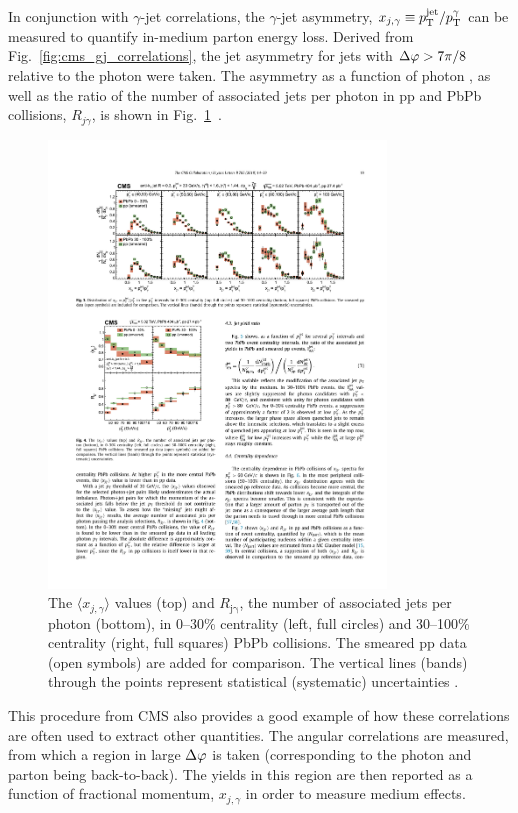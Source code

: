 In conjunction with $\gamma$-jet correlations, the $\gamma$-jet asymmetry, $x_{j,\gamma}\equiv p_{\mathrm{T}}^\mathrm{jet}/p_{\mathrm{T}}^\gamma$ can be measured to quantify in-medium parton energy loss. Derived from Fig.~\ref{fig:cms_gj_correlations}, the jet asymmetry for jets with $\Delta\varphi > 7\pi/8$ relative to the photon were taken. The asymmetry as a function of photon \pt, as well as the ratio of the number of associated jets per photon in pp and PbPb collisions, $R_{j\gamma}$, is shown in Fig.~\ref{fig:cms_gj_quenching.pdf}~\cite{Sirunyan2018}.

\begin{figure}[htpb]
  \centering
  \includegraphics[width=0.8\textwidth]{Introduction/cms_gj_quenching.pdf}
  \caption{The $\langle x_{j,\gamma} \rangle$ values (top) and $R_\mathrm{j\gamma}$, the number of associated jets per photon (bottom), in 0–30\% centrality (left, full circles) and 30–100\% centrality (right, full squares) PbPb collisions. The smeared pp data (open symbols) are added for comparison. The vertical lines (bands) through the points represent statistical (systematic) uncertainties \cite{Sirunyan2018}.}
  \label{fig:cms_gj_quenching.pdf}
\end{figure}

This procedure from CMS also provides a good example of how these correlations are often used to extract other quantities. The angular correlations are measured, from which a region in large $\Delta\varphi$ is taken (corresponding to the photon and parton being back-to-back). The yields in this region are then reported as a function of fractional momentum, $x_{j,\gamma}$ in order to measure medium effects.

